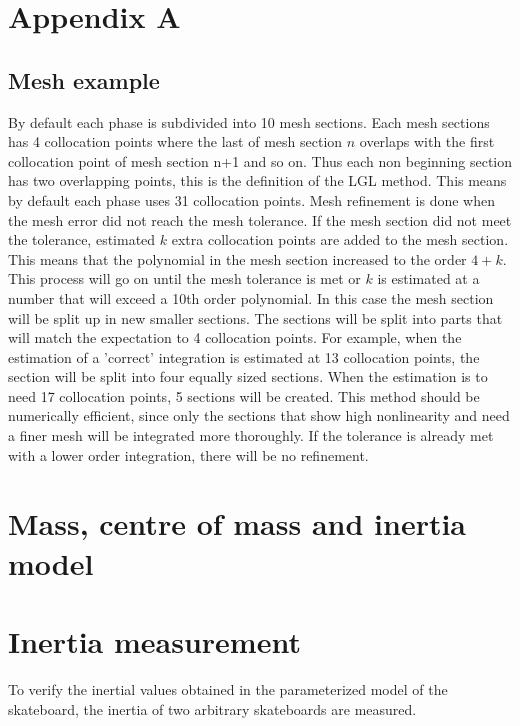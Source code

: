 \onecolumn
\section*{Appendix A}

\subsection*{Mesh example}
 By default each phase is subdivided into 10 mesh sections. Each mesh sections has 4 collocation points where the last of mesh section $n$ overlaps with the first collocation point of mesh section n+1 and so on. Thus each non beginning section has two overlapping points, this is the definition of the LGL method. This means by default each phase uses 31 collocation points. Mesh refinement is done when the mesh error did not reach the mesh tolerance. If the mesh section did not meet the tolerance, estimated $k$ extra collocation points are added to the mesh section. This means that the polynomial in the mesh section increased to the order $4+k$. This process will go on until the mesh tolerance is met or $k$ is estimated at a number that will exceed a 10th order polynomial. In this case the mesh section will be split up in new smaller sections. The sections will be split into parts that will match the expectation to 4 collocation points. For example, when the estimation of a 'correct' integration is estimated at 13 collocation points, the section will be split into four equally sized sections. When the estimation is to need 17 collocation points, 5 sections will be created. This method should be numerically efficient, since only the sections that show high nonlinearity and need a finer mesh will be integrated more thoroughly. If the tolerance is already met with a lower order integration, there will be no refinement\cite{rao_survey_2010,brockie_predictive_nodate,fasano_space_2016}. 

\section*{Mass, centre of mass and inertia model}


\section*{Inertia measurement}
To verify the inertial values obtained in the parameterized model of the skateboard, the inertia of two arbitrary skateboards are measured. 

